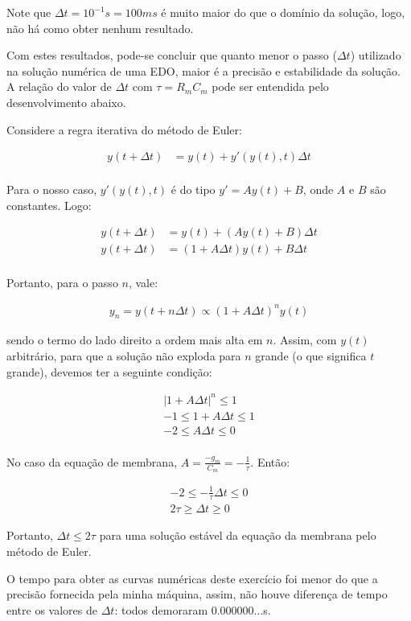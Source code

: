\documentclass[portuguese,12pt,a4paper]{article}
\begin{document}
	Note que $\Delta t = 10^{-1} s = 100 ms$ é muito maior do que o domínio da solução, logo, não há como obter nenhum resultado.
	
	Com estes resultados, pode-se concluir que quanto menor o passo ($\Delta t$) utilizado na solução numérica de uma EDO, maior é a precisão e estabilidade da solução. A relação do valor de $\Delta t$ com $\tau = R_mC_m$ pode ser entendida pelo desenvolvimento abaixo. 	
	
	
	Considere a regra iterativa do método de Euler:
	
	\begin{align*}
		y(t + \Delta t) &= y(t) + y'(y(t), t)\Delta t \\
	\end{align*}
	
	Para o nosso caso, $y'(y(t), t)$ é do tipo $y' = Ay(t) + B$, onde $A$ e $B$ são constantes. Logo:
	
	\begin{align*}
		y(t + \Delta t) &= y(t) + (Ay(t) + B)\Delta t \\
		y(t + \Delta t) &= (1 + A\Delta t)y(t) + B\Delta t \\
	\end{align*}
	
	Portanto, para o passo $n$, vale:
	
	\begin{align*}
		y_n = y(t + n\Delta t) \propto (1 + A\Delta t)^n y(t)
	\end{align*}
	
	sendo o termo do lado direito a ordem mais alta em $n$. Assim, com $y(t)$ arbitrário, para que a solução não exploda para $n$ grande (o que significa $t$ grande), devemos ter a seguinte condição:
	
	\begin{align*}
		|1 + A\Delta t|^n \le 1 \\
		-1 \le 1 + A\Delta t \le 1 \\
		-2 \le A\Delta t \le 0 \\		
	\end{align*}
	
	No caso da equação de membrana, $A = \frac{-g_m}{C_m} = -\frac{1}{\tau}$. Então:
	
	\begin{align*}
		-2 \le -\frac{1}{\tau}\Delta t \le 0 \\
		2\tau \ge \Delta t \ge 0
	\end{align*}
	
	Portanto, $\Delta t \le 2\tau$ para uma solução estável da equação da membrana pelo método de Euler.
	
	O tempo para obter as curvas numéricas deste exercício foi menor do que a precisão fornecida pela minha máquina, assim, não houve diferença de tempo entre os valores de $\Delta t$: todos demoraram 0.000000...s.
	
	
	
	
	
	
	
\end{document}
